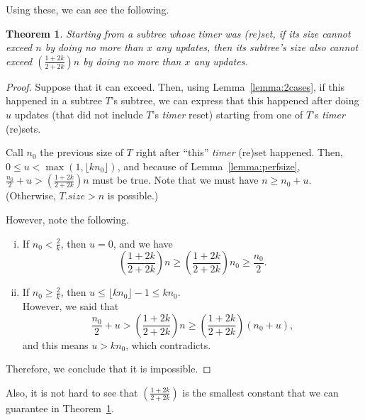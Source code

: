 \documentclass{article}
\newtheorem{theorem}{Theorem}
\begin{document}
Using these, we can see the following.
\begin{theorem}
Starting from a subtree whose timer was (re)set, if its size cannot exceed $n$ by doing no more than $x$ any updates, then its subtree's size also cannot exceed $\left(\frac{1+2k}{2+2k}\right)n$ by doing no more than $x$ any updates.
\label{thm:quotient}
\end{theorem}
\begin{proof}
Suppose that it can exceed. Then, using Lemma~\ref{lemma:2cases}, if this happened in a subtree $T$'s subtree, we can express that this happened after doing $u$ updates (that did not include $T$'s \emph{timer} reset) starting from one of $T$'s \emph{timer} (re)sets.

Call $n_0$ the previous size of $T$ right after ``this'' \emph{timer} (re)set happened. Then, $0\leq u < \max(1, \lfloor kn_0 \rfloor)$, and because of Lemma~\ref{lemma:perfsize}, $\frac{n_0}{2}+u > \left(\frac{1+2k}{2+2k}\right)n$ must be true. Note that we must have $n\geq n_0+u$. (Otherwise, $T.size>n$ is possible.)

However, note the following.
\begin{enumerate}[(i)]
    \item If $n_0 < \frac{2}{k}$, then $u=0$, and we have
    \begin{equation*}
        \left(\frac{1+2k}{2+2k}\right)n \geq \left(\frac{1+2k}{2+2k}\right)n_0 \geq \frac{n_0}{2}.
    \end{equation*}
    \item If $n_0 \geq \frac{2}{k}$, then $u\leq \lfloor kn_0 \rfloor-1 \leq kn_0$.\\
    However, we said that
    \begin{equation*}
        \frac{n_0}{2}+u > \left(\frac{1+2k}{2+2k}\right) n \geq \left(\frac{1+2k}{2+2k}\right)(n_0+u),
    \end{equation*}
    and this means $u>kn_0$, which contradicts.
\end{enumerate}

Therefore, we conclude that it is impossible.
\end{proof}

Also, it is not hard to see that $\left(\frac{1+2k}{2+2k}\right)$ is the smallest constant that we can guarantee in Theorem~\ref{thm:quotient}. 
\end{document}
